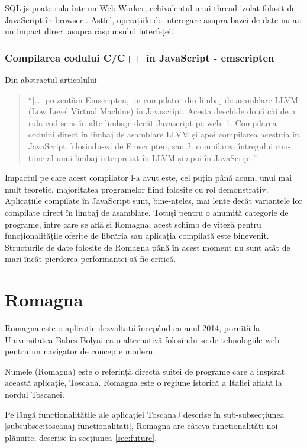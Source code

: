 \documentclass[12pt, a4paper, twoside, romanian]{teza-upb}
\begin{document}
    SQL.js poate rula într-un Web Worker, echivalentul unui thread izolat folosit de JavaScript în browser \cite{Hickson:12:WW}. Astfel, operațiile de interogare asupra bazei de date nu au un impact direct asupra răspunsului interfeței.

    \subsection{Compilarea codului C/C++ în JavaScript - emscripten}
    \label{subsec:emscripten}
      Din abstractul articolului \cite{Zakai:2011:ELC:2048147.2048224}
      \begin{quote}
        ``[\ldots] prezentăm Emscripten, un compilator din limbaj de asamblare LLVM (Low Level Virtual Machine) în Javascript. Acesta deschide două căi de a rula cod scris în alte limbaje decât Javascript pe web: 1. Compilarea codului direct în limbaj de asamblare LLVM și apoi compilarea acestuia în JavaScript folosindu-vă de Emscripten, sau 2. compilarea întregului run-time al unui limbaj interpretat în LLVM și apoi în JavaScript.''
      \end{quote}

    Impactul pe care acest compilator l-a avut este, cel puțin până acum, unul mai mult teoretic, majoritatea programelor fiind folosite cu rol demonstrativ. Aplicațiile compilate în JavaScript sunt, bine-nțeles, mai lente decât variantele lor compilate direct în limbaj de asamblare. Totuși pentru o anumită categorie de programe, între care se află și Romagna, acest schimb de viteză pentru funcționalitățile oferite de librăria sau aplicația compilată este binevenit. Structurile de date folosite de Romagna până în acest moment nu sunt atât de mari încât pierderea performanței să fie critică.


\chapter{Romagna}
\label{chapter:3}

  Romagna este o aplicație dezvoltată începând cu anul 2014, pornită la Universitatea Babeș-Bolyai ca o alternativă folosindu-se de tehnologiile web pentru un navigator de concepte modern.

  Numele (Romagna) este o referință directă suitei de programe care a inspirat această aplicație, Toscana. Romagna este o regiune istorică a Italiei aflată la nordul Toscanei. 

  Pe lângă funcționalitățile ale aplicației ToscanaJ descrise în sub-subsecțiunea \ref{subsubsec:toscanaj-functionalitati}, Romagna are câteva funcționalități noi plănuite, descrise în secțiunea \ref{sec:future}.
\end{document}
